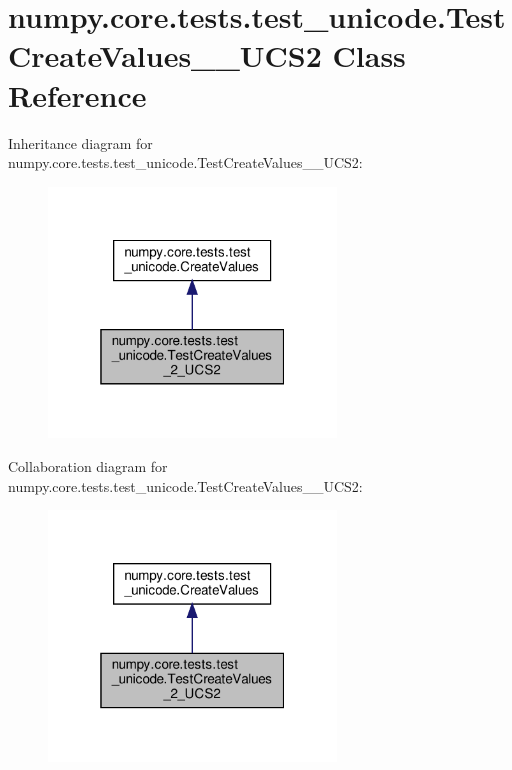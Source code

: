 \hypertarget{classnumpy_1_1core_1_1tests_1_1test__unicode_1_1TestCreateValues__2__UCS2}{}\section{numpy.\+core.\+tests.\+test\+\_\+unicode.\+Test\+Create\+Values\+\_\+\_\+\+U\+C\+S2 Class Reference}
\label{classnumpy_1_1core_1_1tests_1_1test__unicode_1_1TestCreateValues__2__UCS2}


Inheritance diagram for numpy.\+core.\+tests.\+test\+\_\+unicode.\+Test\+Create\+Values\+\_\+\_\+\+U\+C\+S2\+:
\nopagebreak
\begin{figure}[H]
\begin{center}
\leavevmode
\includegraphics[width=217pt]{classnumpy_1_1core_1_1tests_1_1test__unicode_1_1TestCreateValues__2__UCS2__inherit__graph}
\end{center}
\end{figure}


Collaboration diagram for numpy.\+core.\+tests.\+test\+\_\+unicode.\+Test\+Create\+Values\+\_\+\_\+\+U\+C\+S2\+:
\nopagebreak
\begin{figure}[H]
\begin{center}
\leavevmode
\includegraphics[width=217pt]{classnumpy_1_1core_1_1tests_1_1test__unicode_1_1TestCreateValues__2__UCS2__coll__graph}
\end{center}
\end{figure}
